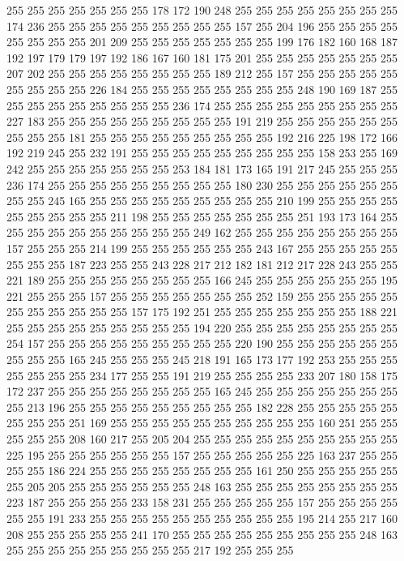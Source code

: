 255 255 255 255 255 255 255 178 172 190 248 255 255 255 255 255 255 255 255 174
236 255 255 255 255 255 255 255 255 255 157 255 204 196 255 255 255 255 255 255
255 255 201 209 255 255 255 255 255 255 255 199 176 182 160 168 187 192 197 179
179 197 192 186 167 160 181 175 201 255 255 255 255 255 255 255 207 202 255 255
255 255 255 255 255 255 189 212 255 157 255 255 255 255 255 255 255 255 255 226
184 255 255 255 255 255 255 255 255 248 190 169 187 255 255 255 255 255 255 255
255 255 236 174 255 255 255 255 255 255 255 255 255 227 183 255 255 255 255 255
255 255 255 255 191 219 255 255 255 255 255 255 255 255 255 181 255 255 255 255
255 255 255 255 255 192 216 225 198 172 166 192 219 245 255 232 191 255 255 255
255 255 255 255 255 255 158 253 255 169 242 255 255 255 255 255 255 255 253 184
181 173 165 191 217 245 255 255 255 236 174 255 255 255 255 255 255 255 255 255
180 230 255 255 255 255 255 255 255 255 245 165 255 255 255 255 255 255 255 255
255 210 199 255 255 255 255 255 255 255 255 255 211 198 255 255 255 255 255 255
255 251 193 173 164 255 255 255 255 255 255 255 255 255 255 249 162 255 255 255
255 255 255 255 255 157 255 255 255 214 199 255 255 255 255 255 255 243 167 255
255 255 255 255 255 255 255 187 223 255 255 243 228 217 212 182 181 212 217 228
243 255 255 221 189 255 255 255 255 255 255 255 255 166 245 255 255 255 255 255
255 195 221 255 255 255 157 255 255 255 255 255 255 255 252 159 255 255 255 255
255 255 255 255 255 255 255 157 175 192 251 255 255 255 255 255 255 255 188 221
255 255 255 255 255 255 255 255 255 194 220 255 255 255 255 255 255 255 255 254
157 255 255 255 255 255 255 255 255 255 220 190 255 255 255 255 255 255 255 255
255 165 245 255 255 255 245 218 191 165 173 177 192 253 255 255 255 255 255 255
255 234 177 255 255 191 219 255 255 255 255 233 207 180 158 175 172 237 255 255
255 255 255 255 255 255 165 245 255 255 255 255 255 255 255 255 213 196 255 255
255 255 255 255 255 255 255 182 228 255 255 255 255 255 255 255 255 251 169 255
255 255 255 255 255 255 255 255 255 160 251 255 255 255 255 255 208 160 217 255
205 204 255 255 255 255 255 255 255 255 255 255 225 195 255 255 255 255 255 255
157 255 255 255 255 255 225 163 237 255 255 255 255 186 224 255 255 255 255 255
255 255 255 161 250 255 255 255 255 255 255 205 205 255 255 255 255 255 255 248
163 255 255 255 255 255 255 255 255 223 187 255 255 255 255 233 158 231 255 255
255 255 255 157 255 255 255 255 255 255 191 233 255 255 255 255 255 255 255 255
255 255 195 214 255 217 160 208 255 255 255 255 255 241 170 255 255 255 255 255
255 255 255 255 248 163 255 255 255 255 255 255 255 255 255 217 192 255 255 255
